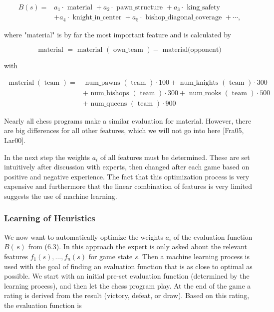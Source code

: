 \documentclass[10pt]{article}
\begin{document}
\begin{align*}
B(s)= & a_{1} \cdot \text { material }+a_{2} \cdot \text { pawn_structure }+a_{3} \cdot \text { king_safety } \\
& +a_{4} \cdot \text { knight_in_center }+a_{5} \cdot \text { bishop_diagonal_coverage }+\cdots, \tag{6.3}
\end{align*}


where "material" is by far the most important feature and is calculated by

$$
\text { material }=\text { material }(\text { own_team })-\text { material(opponent) }
$$

with

$$
\begin{aligned}
\operatorname{material}(\text { team })= & \text { num_pawns }(\text { team }) \cdot 100+\text { num_knights }(\text { team }) \cdot 300 \\
& + \text { num_bishops }(\text { team }) \cdot 300+\text { num_rooks }(\text { team }) \cdot 500 \\
& + \text { num_queens }(\text { team }) \cdot 900
\end{aligned}
$$

Nearly all chess programs make a similar evaluation for material. However, there are big differences for all other features, which we will not go into here [Fra05, Lar00].

In the next step the weights $a_{i}$ of all features must be determined. These are set intuitively after discussion with experts, then changed after each game based on positive and negative experience. The fact that this optimization process is very expensive and furthermore that the linear combination of features is very limited suggests the use of machine learning.

\subsubsection*{Learning of Heuristics}
We now want to automatically optimize the weights $a_{i}$ of the evaluation function $B(\mathrm{~s})$ from (6.3). In this approach the expert is only asked about the relevant features $f_{1}(s), \ldots, f_{n}(s)$ for game state $s$. Then a machine learning process is used with the goal of finding an evaluation function that is as close to optimal as possible. We start with an initial pre-set evaluation function (determined by the learning process), and then let the chess program play. At the end of the game a rating is derived from the result (victory, defeat, or draw). Based on this rating, the evaluation function is
\end{document}
